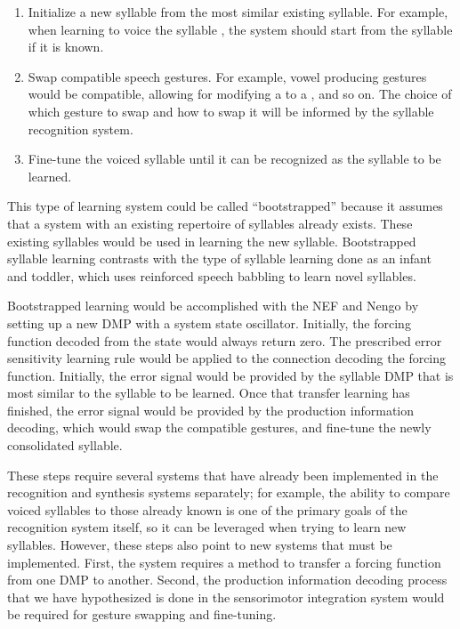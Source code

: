 \begin{enumerate}
\item Initialize a new syllable from the most
  similar existing syllable.
  For example, when learning to voice
  the syllable \ipa{[bA]}, the system should
  start from the syllable \ipa{[gA]} if it is known.
\item Swap compatible speech gestures.
  For example, vowel producing gestures
  would be compatible, allowing for modifying
  a \ipa{[bA]} to a \ipa{[bu]}, and so on.
  The choice of which gesture to swap and
  how to swap it will be informed by
  the syllable recognition system.
\item Fine-tune the voiced syllable
  until it can be recognized as the
  syllable to be learned.
\end{enumerate}

This type of learning system
could be called ``bootstrapped''
because it assumes that a system
with an existing repertoire of syllables
already exists.
These existing syllables would be
used in learning the new syllable.
Bootstrapped syllable learning contrasts with
the type of syllable learning
done as an infant and toddler,
which uses reinforced speech babbling
to learn novel syllables.

Bootstrapped learning
would be accomplished with the NEF and Nengo
by setting up a new DMP with a system state oscillator.
Initially, the forcing function decoded from the state
would always return zero.
The prescribed error sensitivity learning rule
\citep{bekolay2011}
would be applied to the
connection decoding the forcing function.
Initially, the error signal would be provided
by the syllable DMP that is most similar
to the syllable to be learned.
Once that transfer learning has finished,
the error signal would be provided by
the production information decoding,
which would swap the compatible gestures,
and fine-tune the newly consolidated syllable.

These steps require several systems
that have already been implemented
in the recognition and synthesis systems separately;
for example, the ability to compare
voiced syllables to those already known
is one of the primary goals
of the recognition system itself,
so it can be leveraged when trying to learn new syllables.
However, these steps also point to new systems
that must be implemented.
First, the system requires a method
to transfer a forcing function
from one DMP to another.
Second, the production information decoding process
that we have hypothesized is done
in the sensorimotor integration system
would be required for gesture swapping
and fine-tuning.

